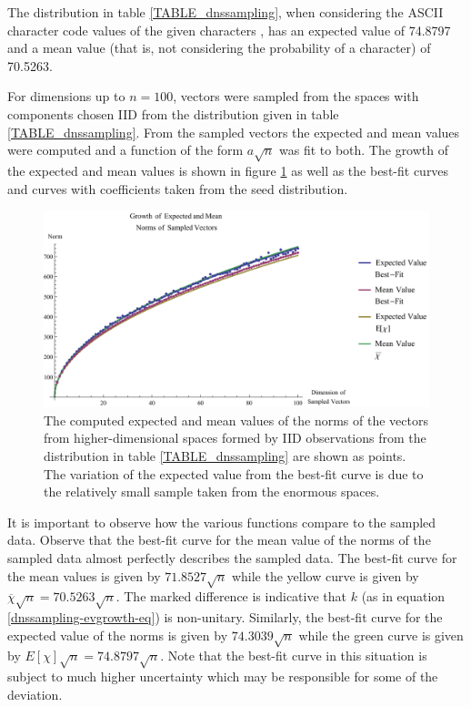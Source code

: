 \documentclass[12pt]{report}
\theoremstyle{remark}
\theoremstyle{definition}
\theoremstyle{definition}
\theoremstyle{definition}
\begin{document}
The distribution in table \ref{TABLE_dnssampling}, when considering the ASCII
character code values of the given characters \cite{asciitable}, has an expected
value of 74.8797 and a mean value (that is, not considering the probability of a
character) of 70.5263.

For dimensions up to $n=100$, vectors were sampled from the spaces with
components chosen IID from the distribution given in table
\ref{TABLE_dnssampling}. From the sampled vectors the expected and mean values
were computed and a function of the form $a\sqrt{n}$ was fit to both. The growth
of the expected and mean values is shown in figure \ref{dnssampling-evgrowth} as
well as the best-fit curves and curves with coefficients taken from the seed
distribution.

\begin{figure}
\centering
\includegraphics[width=\textwidth]{figures/dnssampling-ev_growth.pdf}
\caption[Growth of Expected and Mean Norms of Sampled Vectors]{The computed
expected and mean values of the norms of the vectors from higher-dimensional
spaces formed by IID observations from the distribution in table
\ref{TABLE_dnssampling} are shown as points. The variation of the expected value from the best-fit
curve is due to the relatively small sample taken from the enormous spaces.}
\label{dnssampling-evgrowth}
\end{figure}

It is important to observe how the various functions compare to the sampled
data. Observe that the best-fit curve for the mean value of the norms of the
sampled data almost perfectly describes the sampled data. The best-fit curve for
the mean values is given by $71.8527\sqrt{n}$ while the yellow curve is given by
$\overline{\chi}\sqrt{n}=70.5263\sqrt{n}$. The marked difference is indicative that $k$ (as in equation
\ref{dnssampling-evgrowth-eq}) is non-unitary. Similarly, the best-fit curve for
the expected value of the norms is given by $74.3039\sqrt{n}$ while the green
curve is given by $E[\chi]\sqrt{n}=74.8797\sqrt{n}$. Note that the best-fit curve in this
situation is subject to much higher uncertainty which may be responsible for
some of the deviation.
\end{document}
